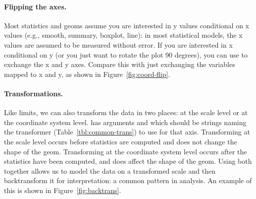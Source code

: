 % 


\paragraph{Flipping the axes.}  Most statistics and geoms assume you are interested in y values conditional on x values (e.g., smooth, summary, boxplot, line): in most statistical models, the x values are assumed to be measured without error.  If you are interested in x conditional on y (or you just want to rotate the plot 90 degrees), you can use  to exchange the x and y axes.  Compare this with just exchanging the variables mapped to x and y, as shown in Figure~\ref{fig:coord-flip}.

% 


\paragraph{Transformations.}  Like limits, we can also transform the data in two places: at the scale level or at the coordinate system level.  has arguments  and  which should be strings naming the transformer (Table~\ref{tbl:common-trans}) to use for that axis. Transforming at the scale level occurs before statistics are computed and does not change the shape of the geom.  Transforming at the coordinate system level occurs after the statistics have been computed, and does affect the shape of the geom.  Using both together allows us to model the data on a transformed scale and then backtransform it for interpretation: a common pattern in analysis.  An example of this is shown in Figure~\ref{fig:backtrans}.

